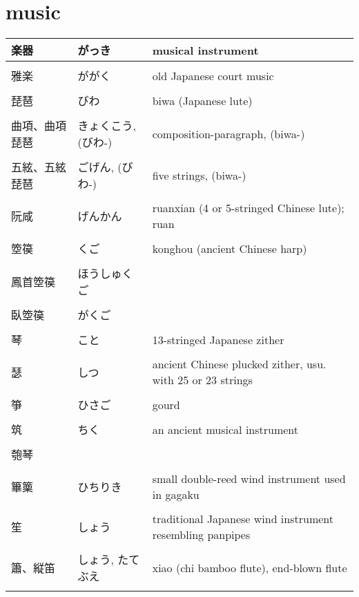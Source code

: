 \documentclass{article}
\newcommand\tabni[1][0.2cm]{\hspace*{#1}}
\begin{document}
\section{ \tabni music}
\begin{tabular}{ l | l | p{10.5cm} }
楽器	& がっき & musical instrument \\ \hline \\[-1em]
雅楽	& ががく & old Japanese court music \\ \hline \\[-1em]
琵琶 & びわ & biwa (Japanese lute) \\ \hline \\[-1em]
曲項、曲項琵琶 & きょくこう,(びわ-) & composition-paragraph, (biwa-) \\ \hline \\[-1em]
五絃、五絃琵琶 & ごげん, (びわ-) & five strings, (biwa-) \\ \hline \\[-1em]
阮咸 & げんかん & ruanxian (4 or 5-stringed Chinese lute); ruan  \\ \hline \\[-1em]
箜篌 & くご & konghou (ancient Chinese harp) \\ \hline \\[-1em]
鳳首箜篌 & ほうしゅくご &  \\ \hline \\[-1em]
臥箜篌 & がくご & \\ \hline \\[-1em]
琴 & こと & 13-stringed Japanese zither \\ \hline \\[-1em]
瑟 & しつ & ancient Chinese plucked zither, usu. with 25 or 23 strings \\ \hline \\[-1em]
箏 & ひさご & gourd \\ \hline \\[-1em]
筑 & ちく & an ancient musical instrument \\ \hline \\[-1em]
匏琴 & & \\ \hline \\[-1em]
篳篥 & ひちりき & small double-reed wind instrument used in gagaku  \\ \hline \\[-1em]
笙 & しょう & traditional Japanese wind instrument resembling panpipes \\ \hline \\[-1em]
簫、縦笛 & しょう, たてぶえ & xiao (chi bamboo flute), end-blown flute \\ \hline \\[-1em]

\end{tabular}
\end{document}
